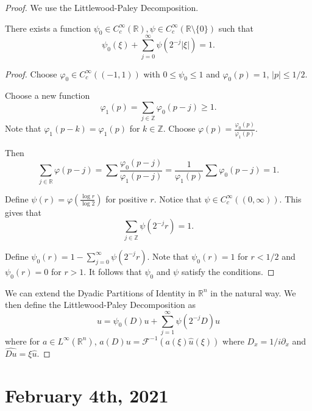 \documentclass[12pt]{scrartcl}
\newcommand{\Z}{\mathbb{Z}}
\newcommand{\R}{\mathbb{R}}
\renewcommand{\hat}{\widehat}
\newcommand{\<}{\langle}
\renewcommand{\>}{\rangle}
\let \phi \varphi
\let \mc \mathcal
\begin{document}
\begin{proof}
We use the Littlewood-Paley Decomposition.  
\begin{lemma}  There exists a function $\psi_0 \in C_c^\infty(\R), \psi \in C_c^\infty(\R \setminus \{0\})$ such that $$\psi_0(\xi) + \sum_{j=0}^\infty \psi(2^{-j}|\xi|) = 1.$$
\end{lemma}
\begin{proof}
Choose $\phi_0 \in C_c^\infty((-1, 1))$ with $0 \le \psi_0 \le 1$ and $\phi_0(p) = 1$, $|p| \le 1/2$.  

Choose a new function $$\phi_1(p) = \sum_{j \in \Z} \phi_0(p - j) \ge 1.$$
Note that $\phi_1(p - k) = \phi_1(p)$ for $k \in \Z$.  Choose $\phi(p) = \frac{\phi_0(p)}{\phi_1(p)}.$

Then
$$\sum_{j \in \R} \phi(p - j) = \sum \frac{\phi_0(p - j)}{\phi_1(p - j)} = \frac{1}{\phi_1(p)} \sum \phi_0(p -j) = 1.$$

Define $\psi(r) = \phi(\frac{\log r}{\log 2})$ for positive $r$.  Notice that $\psi \in C_c^\infty((0, \infty)).$  This gives that 
$$\sum_{j \in \Z} \psi(2^{-j} r) = 1.$$

Define $\psi_0(r) = 1 - \sum_{j = 0}^\infty \psi(2^{-j} r)$.  Note that $\psi_0(r) = 1$ for $r < 1/2$ and $\psi_0(r) = 0$ for $r > 1$.  It follows that $\psi_0$ and $\psi$ satisfy the conditions. 
\end{proof}
We can extend the Dyadic Partitions of Identity in $\R^n$ in the natural way.  We then define the Littlewood-Paley Decomposition as 
$$u = \psi_0(D) u + \sum_{j=1}^\infty \psi(2^{-j} D)u$$
where for $a \in L^\infty(\R^n)$, $a(D)u = \mc F^{-1}(a(\xi)\hat{u}(\xi))$ where $D_x = 1/i \partial_x$ and $\hat{Du} = \xi \hat{u}$.
\end{proof}
\pagebreak
\section{February 4th, 2021}
\end{document}

